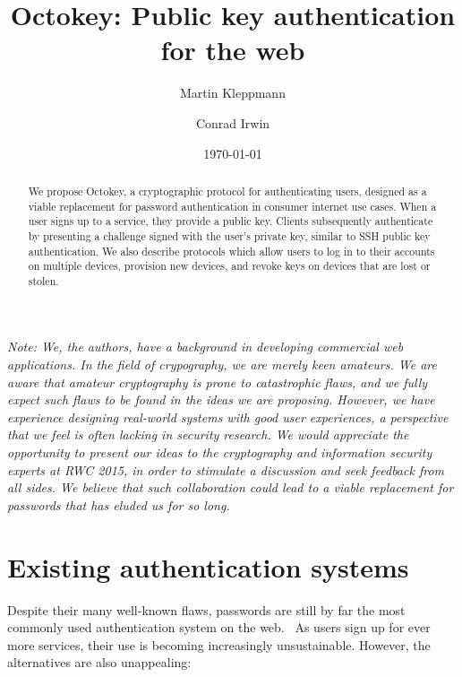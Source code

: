 \documentclass{article}
\begin{document}
\title{Octokey: Public key authentication for the web}
\author{Martin Kleppmann \and Conrad Irwin}
\date{\today}
\maketitle

\begin{abstract}
We propose Octokey, a cryptographic protocol for authenticating users, designed as a viable
replacement for password authentication in consumer internet use cases. When a user signs up to a
service, they provide a public key. Clients subsequently authenticate by presenting a challenge
signed with the user's private key, similar to SSH public key authentication. We also describe
protocols which allow users to log in to their accounts on multiple devices, provision new devices,
and revoke keys on devices that are lost or stolen.
\end{abstract}

\emph{Note: We, the authors, have a background in developing commercial web applications. In the
field of crypography, we are merely keen amateurs. We are aware that amateur cryptography is prone
to catastrophic flaws, and we fully expect such flaws to be found in the ideas we are proposing.
However, we have experience designing real-world systems with good user experiences, a perspective
that we feel is often lacking in security research. We would appreciate the opportunity to present
our ideas to the cryptography and information security experts at RWC 2015, in order to stimulate a
discussion and seek feedback from all sides. We believe that such collaboration could lead to a
viable replacement for passwords that has eluded us for so long.}

\section{Existing authentication systems}

Despite their many well-known flaws, passwords are still by far the most commonly used
authentication system on the web.~\cite{Bonneau12} As users sign up for ever more services, their
use is becoming increasingly unsustainable. However, the alternatives are also unappealing:
\end{document}
